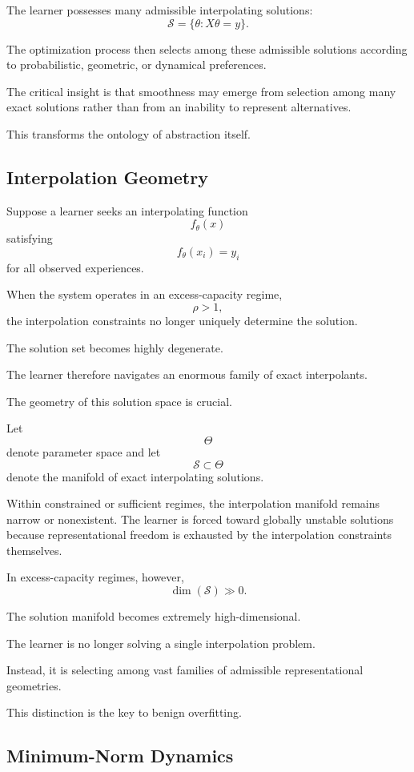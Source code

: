 \documentclass[12pt,a4paper]{article}
\begin{document}
The learner possesses many admissible interpolating solutions:
\[
\mathcal{S}
=
\{
\theta
:
X\theta = y
\}.
\]

The optimization process then selects among these admissible solutions according to probabilistic, geometric, or dynamical preferences.

The critical insight is that smoothness may emerge from selection among many exact solutions rather than from an inability to represent alternatives.

This transforms the ontology of abstraction itself.

\subsection{Interpolation Geometry}

Suppose a learner seeks an interpolating function
\[
f_\theta(x)
\]
satisfying
\[
f_\theta(x_i) = y_i
\]
for all observed experiences.

When the system operates in an excess-capacity regime,
\[
\rho > 1,
\]
the interpolation constraints no longer uniquely determine the solution.

The solution set becomes highly degenerate.

The learner therefore navigates an enormous family of exact interpolants.

The geometry of this solution space is crucial.

Let
\[
\Theta
\]
denote parameter space and let
\[
\mathcal{S}
\subset
\Theta
\]
denote the manifold of exact interpolating solutions.

Within constrained or sufficient regimes, the interpolation manifold remains narrow or nonexistent. The learner is forced toward globally unstable solutions because representational freedom is exhausted by the interpolation constraints themselves.

In excess-capacity regimes, however,
\[
\dim(\mathcal{S})
\gg 0.
\]

The solution manifold becomes extremely high-dimensional.

The learner is no longer solving a single interpolation problem.

Instead, it is selecting among vast families of admissible representational geometries.

This distinction is the key to benign overfitting.

\subsection{Minimum-Norm Dynamics}
\end{document}
